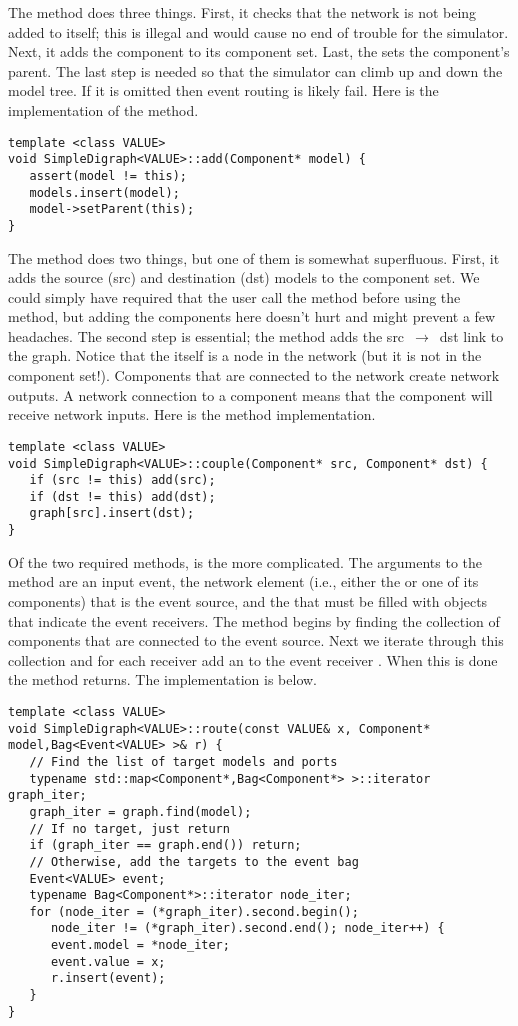 The  method does three things. First, it checks that the network is not being added to itself; this is illegal and would cause no end of trouble for the simulator. Next, it adds the component to its component set. Last, the  sets the component's parent. The last step is needed so that the simulator can climb up and down the model tree. If it is omitted then event routing is likely fail. Here is the implementation of the  method.
\begin{verbatim}
template <class VALUE> 
void SimpleDigraph<VALUE>::add(Component* model) {
   assert(model != this);
   models.insert(model);
   model->setParent(this);
}
\end{verbatim}

The  method does two things, but one of them is somewhat superfluous. First, it adds the source (src) and destination (dst) models to the component set. We could simply have required that the user call the  method before using the  method, but adding the components here doesn't hurt and might prevent a few headaches. The second step is essential; the method adds the \mbox{src $\rightarrow$ dst} link to the graph. Notice that the  itself is a node in the network (but it is not in the component set!). Components that are connected to the network create network outputs. A network connection to a component means that the component will receive network inputs. Here is the  method implementation.
\begin{verbatim}
template <class VALUE>
void SimpleDigraph<VALUE>::couple(Component* src, Component* dst) { 
   if (src != this) add(src);
   if (dst != this) add(dst);
   graph[src].insert(dst);
}
\end{verbatim}

Of the two required methods,  is the more complicated. The arguments to the method are an input event, the network element (i.e., either the  or one of its components) that is the event source, and the  that must be filled with  objects that indicate the event receivers. The method begins by finding the collection of components that are connected to the event source. Next we iterate through this collection and for each receiver add an  to the event receiver . When this is done the method returns. The implementation is below.
\begin{verbatim}
template <class VALUE>
void SimpleDigraph<VALUE>::route(const VALUE& x, Component* model,Bag<Event<VALUE> >& r) {
   // Find the list of target models and ports
   typename std::map<Component*,Bag<Component*> >::iterator graph_iter;
   graph_iter = graph.find(model);
   // If no target, just return
   if (graph_iter == graph.end()) return;
   // Otherwise, add the targets to the event bag
   Event<VALUE> event;
   typename Bag<Component*>::iterator node_iter;
   for (node_iter = (*graph_iter).second.begin();
      node_iter != (*graph_iter).second.end(); node_iter++) {
      event.model = *node_iter;
      event.value = x;
      r.insert(event);
   }
}
\end{verbatim}

